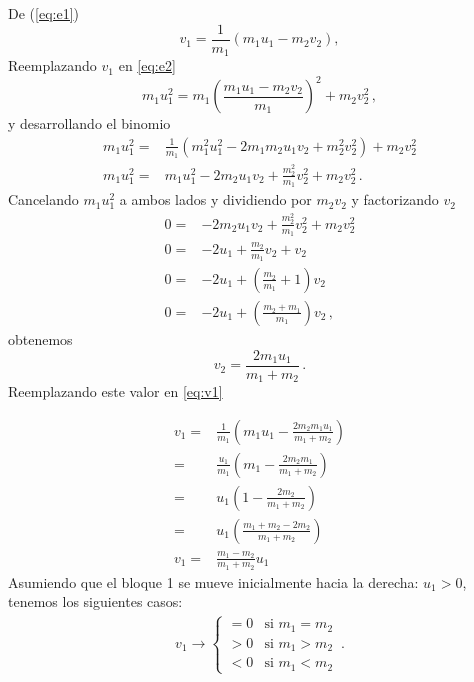 \begin{itemize}
De (\ref{eq:e1})
\begin{equation}
  \label{eq:v1}
  v_1 = \frac{1}{m_1}( m_1u_1 - m_2 v_2),
\end{equation}
Reemplazando $v_1$ en \ref{eq:e2}
\begin{equation}
   m_1 u_1^2 = m_1 \left( \frac{m_1u_1 - m_2 v_2}{m_1} \right)^2 +  m_2 v^2_2\,,
\end{equation}
y desarrollando el binomio
\begin{align}
 m_1 u_1^2 =& \frac{1}{m_1}( m_1^2 u_1^2 - 2 m_1 m_2 u_1 v_2 + m_2^2 v_2^2) + m_2 v_2^2\nonumber\\
m_1 u_1^2 =&  m_1 u_1^2 - 2 m_2 u_1 v_2 + \frac{m_2^2}{m_1} v_2^2 + m_2 v_2^2\,.
\end{align}
Cancelando $m_1 u_1^2$ a ambos lados y dividiendo por $m_2v_2$ y factorizando $v_2$
\begin{align}
  0=& - 2 m_2 u_1 v_2 + \frac{m_2^2}{m_1} v_2^2 + m_2 v_2^2\nonumber\\
  0=& - 2  u_1  + \frac{m_2}{m_1} v_2 + v_2\nonumber\\
  0=& - 2  u_1  + \left(\frac{m_2}{m_1} +1 \right)v_2\nonumber\\
  0=& - 2  u_1  + \left(\frac{m_2+m_1}{m_1}\right)v_2\,,
\end{align}
obtenemos
\begin{equation}
  v_2 = \frac{2m_1 u_1}{m_1+ m_2}\,.
\end{equation}
Reemplazando este valor en \ref{eq:v1}

\begin{align}
  v_1 =& \frac{1}{m_1}\left(m_1u_1 - \frac{2m_2 m_1u_1}{m_1+m_2} \right)\nonumber\\
  =& \frac{u_1}{m_1}\left(m_1 - \frac{2m_2 m_1}{m_1+m_2} \right)\nonumber\\
  =& u_1\left(1 - \frac{2m_2}{m_1+m_2} \right)\nonumber\\
  =& u_1\left(\frac{m_1+m_2 - 2m_2}{m_1+m_2} \right)\nonumber\\
  v_1 = &\frac{m_1 - m_2}{m_1 + m_2} u_1
\end{align}
Asumiendo que el bloque 1 se mueve inicialmente hacia la derecha: $u_1>0$,  tenemos los siguientes casos:
\begin{align}
  v_1\to
  \begin{cases}
    =0 & \text{si\ }m_1=m_2\\
    >0 & \text{si\ }m_1>m_2\\
    <0 & \text{si\ }m_1<m_2
  \end{cases}\,.
\end{align}




\end{itemize}
